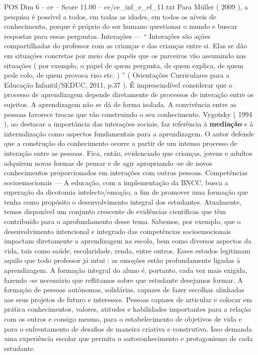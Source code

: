 \begin{textsample}{POS Dim 6 – ce – Score 11.00 – ce/ce\_inf\_e\_ef\_11.txt}
Para Müller ( 2009 ), a pesquisa é possível a todos, em todas as idades, em todos os níveis de conhecimento, porque é próprio do ser humano questionar o mundo e buscar respostas para essas perguntas.
Interações — “ Interações são ações compartilhadas do professor com as crianças e das crianças entre si.
Elas se dão em situações concretas por meio dos papéis que os parceiros vão assumindo nas situações ( por exemplo, o papel de quem pergunta, de quem explica, de quem pede colo, de quem provoca riso etc. ) ” ( Orientações Curriculares para a Educação Infantil/SEDUC, 2011, p.37 ).
É imprescindível considerar que o processo de aprendizagem depende diretamente de processos de interação entre os sujeitos.
A aprendizagem não se dá de forma isolada.
A convivência entre as pessoas favorece trocas que vão construindo o seu conhecimento.
Vygotsky ( 1994 ), ao destacar a importância das interações sociais, faz referência à \textbf{mediação} e à internalização como aspectos fundamentais para a aprendizagem.
O autor defende que a construção do conhecimento ocorre a partir de um intenso processo de interação entre as pessoas.
Fica, então, evidenciado que crianças, jovens e adultos adquirem novas formas de pensar e de agir apropriando -se de novos conhecimentos proporcionados em interações com outras pessoas.
Competências socioemocionais — A educação, com a implementação da BNCC, busca a superação da dicotomia intelecto/emoção, a fim de promover uma formação que tenha como propósito o desenvolvimento integral dos estudantes.
Atualmente, temos disponível um conjunto crescente de evidências científicas que têm contribuído para o aprofundamento desse tema.
Sabemos, por exemplo, que o desenvolvimento intencional e integrado das competências socioemocionais impactam diretamente a aprendizagem na escola, bem como diversos aspectos da vida, tais como saúde, escolaridade, renda, entre outros.
Esses estudos legitimam aquilo que todo professor já intui : as emoções estão profundamente ligadas à aprendizagem.
A formação integral do aluno é, portanto, cada vez mais exigida, fazendo -se necessário que reflitamos sobre que estudante desejamos formar.
A formação de pessoas autônomas, solidárias, capazes de fazer escolhas alinhadas aos seus projetos de futuro e interesses.
Pessoas capazes de articular e colocar em prática conhecimentos, valores, atitudes e habilidades importantes para a relação com os outros e consigo mesmo, para o estabelecimento de objetivos de vida e para o enfrentamento de desafios de maneira criativa e construtiva.
Isso demanda uma experiência escolar que permita o autoconhecimento e protagonismo de cada estudante.

\end{textsample}
